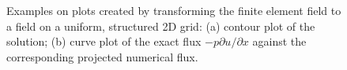 \begin{figure}
  \centering
  \caption{Examples on plots created by transforming the finite
    element field to a field on a uniform, structured 2D grid: (a)
    contour plot of the solution; (b) curve plot of the exact flux
    $-p\partial u/\partial x$ against the corresponding projected
    numerical flux.}
  \label{langtangen:poisson:2D:fig2}
\end{figure}

